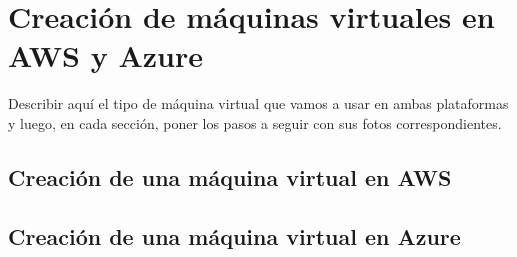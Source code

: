 \chapter{Creación de máquinas virtuales en AWS y Azure}
Describir aquí el tipo de máquina virtual que vamos a usar en ambas plataformas y luego, en cada sección, poner los pasos a seguir con sus fotos correspondientes.
\section{Creación de una máquina virtual en AWS}


\section{Creación de una máquina virtual en Azure}